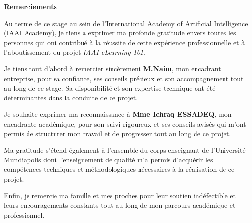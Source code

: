 \documentclass[12pt, a4paper]{report}
\begin{document}
\clearpage
\thispagestyle{empty}
\setcounter{page}{2}
\begin{center}
  {\sffamily\large\bfseries Remerciements}
\end{center}
\vspace{1cm}
\onehalfspacing
{\selectfont\fontsize{12}{18}\selectfont
Au terme de ce stage au sein de l'International Academy of Artificial Intelligence (IAAI Academy), je tiens à exprimer ma profonde gratitude envers toutes les personnes qui ont contribué à la réussite de cette expérience professionnelle et à l'aboutissement du projet \textit{IAAI eLearning 101}.

Je tiens tout d'abord à remercier sincèrement \textbf{M.Naim}, mon encadrant entreprise, pour sa confiance, ses conseils précieux et son accompagnement tout au long de ce stage. Sa disponibilité et son expertise technique ont été déterminantes dans la conduite de ce projet.

Je souhaite exprimer ma reconnaissance à \textbf{Mme Ichraq ESSADEQ}, mon encadrante académique, pour son suivi rigoureux et ses conseils avisés qui m'ont permis de structurer mon travail et de progresser tout au long de ce projet.

Ma gratitude s'étend également à l'ensemble du corps enseignant de l'Université Mundiapolis dont l'enseignement de qualité m'a permis d'acquérir les compétences techniques et méthodologiques nécessaires à la réalisation de ce projet.

Enfin, je remercie ma famille et mes proches pour leur soutien indéfectible et leurs encouragements constants tout au long de mon parcours académique et professionnel.
}
\end{document}
